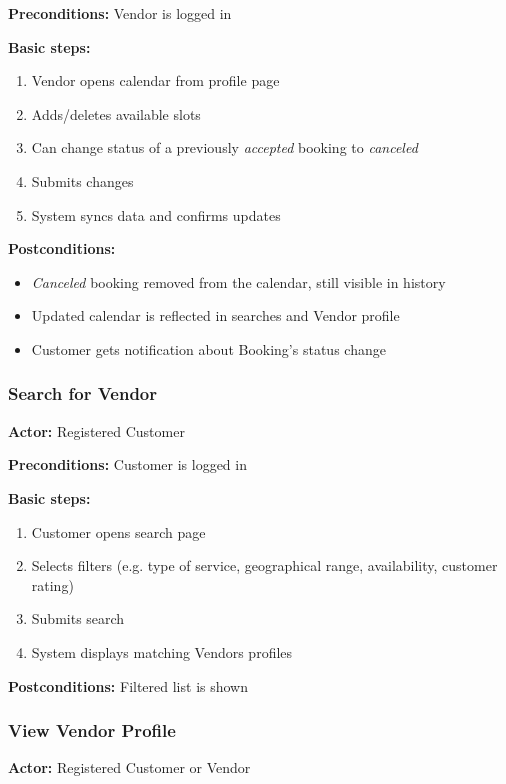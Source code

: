 \documentclass[11pt,a4paper]{article}
\begin{document}
\noindent \textbf{Preconditions:} Vendor is logged in

\noindent \textbf{Basic steps:}
\begin{enumerate}
  \item Vendor opens calendar from profile page
  \item Adds/deletes available slots
  \item Can change status of a previously \textit{accepted} booking
    to \textit{canceled}
  \item Submits changes
  \item System syncs data and confirms updates
\end{enumerate}

\noindent \textbf{Postconditions:}
\begin{itemize}
  \item \textit{Canceled} booking removed from the calendar, still
    visible in history
  \item Updated calendar is reflected in searches and Vendor profile
  \item Customer gets notification about Booking's status change
\end{itemize}

\subsubsection{Search for Vendor}

\textbf{Actor:} Registered Customer

\noindent \textbf{Preconditions:} Customer is logged in

\noindent \textbf{Basic steps:}
\begin{enumerate}
  \item Customer opens search page
  \item Selects filters (e.g. type of service, geographical range,
    availability, customer rating)
  \item Submits search
  \item System displays matching Vendors profiles
\end{enumerate}

\noindent \textbf{Postconditions:} Filtered list is shown

\subsubsection{View Vendor Profile}

\textbf{Actor:} Registered Customer or Vendor
\end{document}
